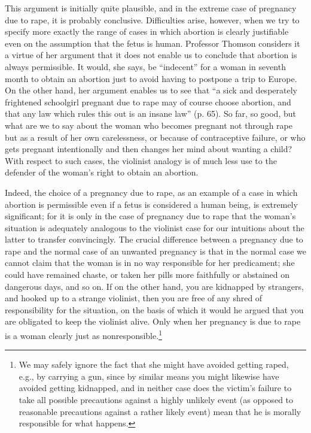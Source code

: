 This argument is initially quite plausible, and in the
extreme case of pregnancy due to rape, it is probably
conclusive. Difficulties arise, however, when we try to
specify more exactly the range of cases in which abortion
is clearly justifiable even on the assumption that the fetus
is human. Professor Thomson considers it a virtue of her
argument that it does not enable us to conclude that
abortion is always permissible. It would, she says, be
“indecent” for a woman in seventh month to obtain an
abortion just to avoid having to postpone a trip to Europe.
On the other hand, her argument enables us to see that “a
sick and desperately frightened schoolgirl pregnant due to
rape may of course choose abortion, and that any law
which rules this out is an insane law” (p. 65). So far, so
good, but what are we to say about the woman who
becomes pregnant not through rape but as a result of her
own carelessness, or because of contraceptive failure, or
who gets pregnant intentionally and then changes her
mind about wanting a child? With respect to such cases,
the violinist analogy is of much less use to the defender of
the woman’s right to obtain an abortion.

Indeed, the choice of a pregnancy due to rape, as an
example of a case in which abortion is permissible even if
a fetus is considered a human being, is extremely
significant; for it is only in the case of pregnancy due to
rape that the woman’s situation is adequately analogous to
the violinist case for our intuitions about the latter to
transfer convincingly. The crucial difference between a
pregnancy due to rape and the normal case of an
unwanted pregnancy is that in the normal case we cannot
claim that the woman is in no way responsible for her
predicament; she could have remained chaste, or taken
her pills more faithfully or abstained on dangerous days,
and so on. If on the other hand, you are kidnapped by
strangers, and hooked up to a strange violinist, then you
are free of any shred of responsibility for the situation, on
the basis of which it would he argued that you are
obligated to keep the violinist alive. Only when her
pregnancy is due to rape is a woman clearly just as
nonresponsible.\footnote{We may safely ignore the fact that she might have avoided
getting raped, e.g., by carrying a gun, since by similar means
you might likewise have avoided getting kidnapped, and in
neither case does the victim's failure to take all possible
precautions against a highly unlikely event (as opposed to
reasonable precautions against a rather likely event) mean that
he is morally responsible for what happens.}

